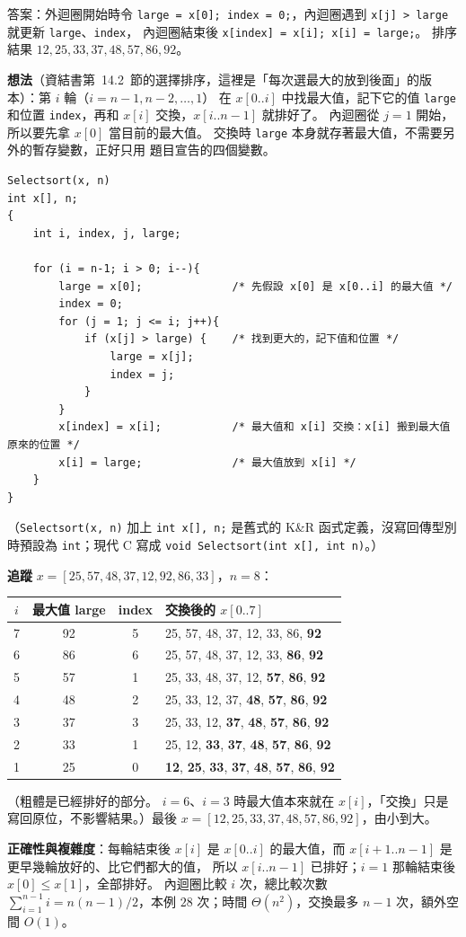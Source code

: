 \begin{pastsoln}
答案：外迴圈開始時令 \texttt{large = x[0]; index = 0;}，內迴圈遇到 \texttt{x[j] > large} 就更新 \texttt{large}、\texttt{index}，
內迴圈結束後 \texttt{x[index] = x[i]; x[i] = large;}。 排序結果 $12, 25, 33, 37, 48, 57, 86, 92$。

\textbf{想法}（資結書第~14.2~節的選擇排序，這裡是「每次選最大的放到後面」的版本）：第 $i$ 輪（$i = n-1, n-2, \ldots, 1$）
在 $x[0..i]$ 中找最大值，記下它的值 \texttt{large} 和位置 \texttt{index}，再和 $x[i]$ 交換，$x[i..n-1]$ 就排好了。 內迴圈從
$j = 1$ 開始，所以要先拿 $x[0]$ 當目前的最大值。 交換時 \texttt{large} 本身就存著最大值，不需要另外的暫存變數，正好只用
題目宣告的四個變數。
\begin{verbatim}
Selectsort(x, n)
int x[], n;
{
    int i, index, j, large;

    for (i = n-1; i > 0; i--){
        large = x[0];              /* 先假設 x[0] 是 x[0..i] 的最大值 */
        index = 0;
        for (j = 1; j <= i; j++){
            if (x[j] > large) {    /* 找到更大的，記下值和位置 */
                large = x[j];
                index = j;
            }
        }
        x[index] = x[i];           /* 最大值和 x[i] 交換：x[i] 搬到最大值原來的位置 */
        x[i] = large;              /* 最大值放到 x[i] */
    }
}
\end{verbatim}
（\texttt{Selectsort(x, n)} 加上 \texttt{int x[], n;} 是舊式的 K\&R 函式定義，沒寫回傳型別時預設為 \texttt{int}；現代 C 寫成
\texttt{void Selectsort(int x[], int n)}。）

\textbf{追蹤} $x = [25, 57, 48, 37, 12, 92, 86, 33]$，$n = 8$：
\begin{center}
\small
\begin{tabular}{cccl}
\toprule
$i$ & 最大值 large & index & 交換後的 $x[0..7]$ \\
\midrule
7 & 92 & 5 & 25, 57, 48, 37, 12, 33, 86, \textbf{92} \\
6 & 86 & 6 & 25, 57, 48, 37, 12, 33, \textbf{86}, \textbf{92} \\
5 & 57 & 1 & 25, 33, 48, 37, 12, \textbf{57}, \textbf{86}, \textbf{92} \\
4 & 48 & 2 & 25, 33, 12, 37, \textbf{48}, \textbf{57}, \textbf{86}, \textbf{92} \\
3 & 37 & 3 & 25, 33, 12, \textbf{37}, \textbf{48}, \textbf{57}, \textbf{86}, \textbf{92} \\
2 & 33 & 1 & 25, 12, \textbf{33}, \textbf{37}, \textbf{48}, \textbf{57}, \textbf{86}, \textbf{92} \\
1 & 25 & 0 & \textbf{12}, \textbf{25}, \textbf{33}, \textbf{37}, \textbf{48}, \textbf{57}, \textbf{86}, \textbf{92} \\
\bottomrule
\end{tabular}
\end{center}
（粗體是已經排好的部分。 $i = 6$、$i = 3$ 時最大值本來就在 $x[i]$，「交換」只是寫回原位，不影響結果。）最後
$x = [12, 25, 33, 37, 48, 57, 86, 92]$，由小到大。

\textbf{正確性與複雜度}：每輪結束後 $x[i]$ 是 $x[0..i]$ 的最大值，而 $x[i+1..n-1]$ 是更早幾輪放好的、比它們都大的值，
所以 $x[i..n-1]$ 已排好；$i = 1$ 那輪結束後 $x[0] \le x[1]$，全部排好。 內迴圈比較 $i$ 次，總比較次數
$\sum_{i=1}^{n-1} i = n(n-1)/2$，本例 $28$ 次；時間 $\Theta(n^2)$，交換最多 $n - 1$ 次，額外空間 $O(1)$。
\end{pastsoln}
